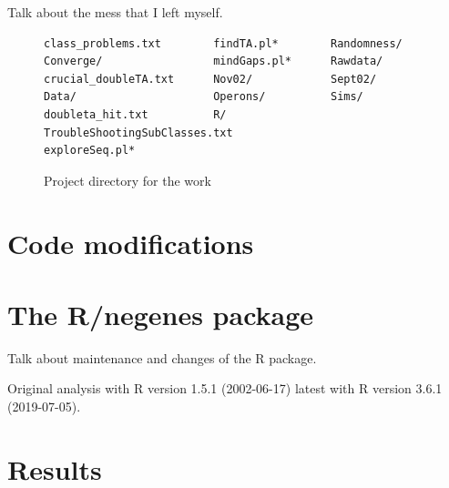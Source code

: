 Talk about the mess that I left myself.

\begin{figure}

\begin{lstlisting}
class_problems.txt        findTA.pl*        Randomness/
Converge/                 mindGaps.pl*      Rawdata/
crucial_doubleTA.txt      Nov02/            Sept02/
Data/                     Operons/          Sims/
doubleta_hit.txt          R/                TroubleShootingSubClasses.txt
exploreSeq.pl*
\end{lstlisting}

\caption{Project directory for the work}
\end{figure}


\section{Code modifications}

\section{The R/negenes package}

Talk about maintenance and changes of the R package.

Original analysis with R version 1.5.1 (2002-06-17)
latest with R version 3.6.1 (2019-07-05).


\section{Results}

